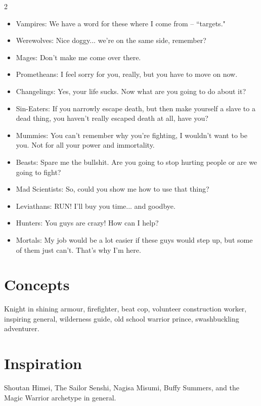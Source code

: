\begin{multicols}{2}
\begin{itemize}
\item Vampires: We have a word for these where I come from -- \textquotedblleft targets."
\item Werewolves: Nice doggy... we're on the same side, remember?
\item Mages: Don't make me come over there.
\item Prometheans: I feel sorry for you, really, but you have to move on now.
\item Changelings: Yes, your life sucks. Now what are you going to do about it?
\item Sin-Eaters: If you narrowly escape death, but then make yourself a slave to a dead thing, you haven't really escaped death at all, have you?
\item Mummies: You can't remember why you're fighting, I wouldn't want to be you. Not for all your power and immortality.
\item Beasts: Spare me the bullshit. Are you going to stop hurting people or are we going to fight?

\item Mad Scientists: So, could you show me how to use that thing?
\item Leviathans: RUN! I'll buy you time... and goodbye. 

\item Hunters: You guys are crazy! How can I help?
\item Mortals: My job would be a lot easier if these guys would step up, but some of them just can't. That's why I'm here. 
\end{itemize}

\section*{Concepts}

Knight in shining armour, firefighter, beat cop, volunteer construction worker, inspiring general, wilderness guide, old school warrior prince, swashbuckling adventurer. 

\section*{Inspiration}
Shoutan Himei, The Sailor Senshi, Nagisa Misumi, Buffy Summers, and the Magic Warrior archetype in general. 

\end{multicols}\newpage{}

